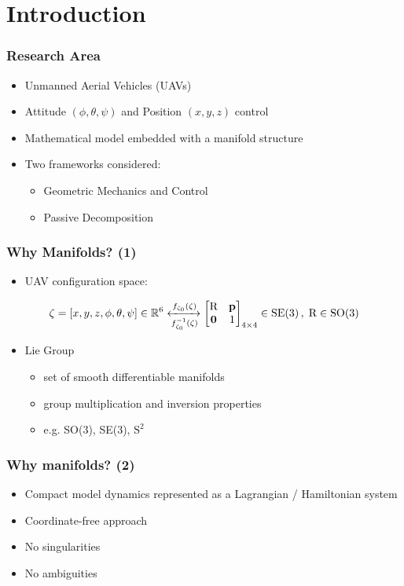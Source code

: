 
\section{Introduction}

\begin{frame}
	\frametitle{Research Area}
	
	\begin{itemize}
		\item Unmanned Aerial Vehicles (UAVs)
		\item Attitude $(\phi, \theta, \psi)$ and Position $(x, y, z)$ control
		\item Mathematical model embedded with a manifold structure
		\item Two frameworks considered:
		
		\begin{itemize}
			\item Geometric Mechanics and Control
			\item Passive Decomposition
		\end{itemize}
	\end{itemize}
\end{frame}

\begin{frame}
	\frametitle{Why Manifolds? (1)}
	
	\begin{itemize}
		\item UAV configuration space:
	\end{itemize}
	\begin{equation*}
		\zeta = [x, y, z, \phi, \theta, \psi] \in \mathbb{R}^6 
		\xleftrightarrow[f_{\zeta_0}^{-1}(\zeta)]{f_{\zeta_0}(\zeta)}
		\begin{bmatrix}
		\text{R} & \textbf{p} \\
		\textbf{0} & 1
		\end{bmatrix}_{4\times 4} \in \text{SE(3)} \, , \; \text{R} \in \text{SO(3)}
	\end{equation*}
	
	\begin{itemize}
		\item Lie Group
		\begin{itemize}
			\item set of smooth differentiable manifolds
			\item group multiplication and inversion properties
			\item e.g. SO(3), SE(3), $\text{S}^2$
		\end{itemize}
	\end{itemize}
\end{frame}

\begin{frame}
	\frametitle{Why manifolds? (2)}
	
	\begin{itemize}
		\item Compact model dynamics represented as a Lagrangian / Hamiltonian system
		\item Coordinate-free approach
		\item No singularities
		\item No ambiguities
	\end{itemize}
\end{frame}